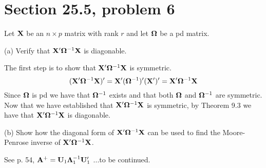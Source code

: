 \section{Section 25.5, problem 6}
Let $\bf X$ be an $n\times p$ matrix with rank $r$ and let
$\bf\Omega$ be a pd matrix.

\bigskip
\noindent
(a) Verify that ${\bf X}'{\bf\Omega}^{-1}{\bf X}$ is diagonable.

\bigskip
\noindent
The first step is to show that ${\bf X}'{\bf\Omega}^{-1}{\bf X}$
is symmetric.
$$({\bf X}'{\bf\Omega}^{-1}{\bf X})'
={\bf X}'({\bf\Omega}^{-1})'({\bf X}')'
={\bf X}'{\bf\Omega}^{-1}{\bf X}
$$
Since $\bf\Omega$ is pd we have that ${\bf\Omega}^{-1}$ exists
and that both ${\bf\Omega}$ and ${\bf\Omega}^{-1}$ are symmetric.
Now that we have established that
${\bf X}'{\bf\Omega}^{-1}{\bf X}$
is symmetric, by Theorem 9.3 we have that
${\bf X}'{\bf\Omega}^{-1}{\bf X}$
is diagonable.

\bigskip
\noindent
(b) Show how the diagonal form of ${\bf X}'{\bf\Omega}^{-1}{\bf X}$
can be used to find the Moore-Penrose inverse of
${\bf X}'{\bf\Omega}^{-1}{\bf X}$.

\bigskip
\noindent
See p. 54, ${\bf A}^+={\bf U}_1{\bf\Lambda}_1^{-1}{\bf U}_1'$
...to be continued.

